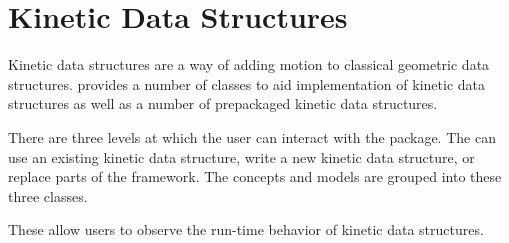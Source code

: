 \chapter{Kinetic Data Structures}
\label{ref-chapter-kds}


Kinetic data structures are a way of adding motion to classical
geometric data structures. \cgal provides a number of classes to aid
implementation of kinetic data structures as well as a number of
prepackaged kinetic data structures.

There are three levels at which the user can interact with the
package. The can use an existing kinetic data structure, write a new
kinetic data structure, or replace parts of the framework. The
concepts and models are grouped into these three classes.









These allow users to observe the run-time behavior of kinetic data structures.










